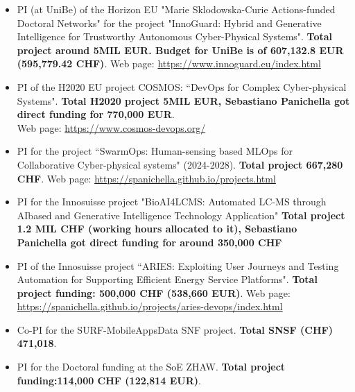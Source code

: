 \documentclass[11pt]{article}
\begin{document}
\begin{itemize}
  \item PI (at UniBe) of the Horizon EU  "Marie Sklodowska-Curie Actions-funded Doctoral Networks" for the project "InnoGuard: Hybrid and Generative Intelligence for Trustworthy Autonomous Cyber-Physical Systems".
\textbf{Total project around 5MIL EUR. Budget for UniBe is of 607,132.8 EUR (595,779.42 CHF)}. Web page: \href{https://www.innoguard.eu/index.html}{https://www.innoguard.eu/index.html}
\vspace{-2.5mm}
  \item PI of the H2020 EU project COSMOS: ``DevOps for Complex Cyber-physical Systems". \textbf{Total H2020 project 5MIL EUR, Sebastiano Panichella got direct funding for 770,000 EUR}. \\Web page: \href{https://www.cosmos-devops.org/}{https://www.cosmos-devops.org/}
\vspace{-2.5mm}
\item PI for   the project ``SwarmOps: Human-sensing based MLOps for Collaborative Cyber-physical systems" (2024-2028).  \textbf{Total project 667,280 CHF}.  Web page: \href{https://spanichella.github.io/projects.html}{https://spanichella.github.io/projects.html}
\vspace{-2.5mm}
\item PI for the Innosuisse project  "BioAI4LCMS: Automated LC-MS through AIbased and Generative Intelligence Technology Application" \textbf{Total project 1.2 MIL CHF (working hours allocated to it), Sebastiano Panichella got direct funding for around 350,000 CHF}
\vspace{-2.5mm}
  \item PI of the Innosuisse project ``ARIES: Exploiting User Journeys and Testing Automation for Supporting Efficient Energy Service Platforms". \textbf{Total project funding: \textbf{500,000 CHF} (538,660 EUR)}. Web page: \href{https://spanichella.github.io/projects/aries-devops/index.html}{https://spanichella.github.io/projects/aries-devops/index.html}
\vspace{-2.5mm}
  \item Co-PI for
   the SURF-MobileAppsData SNF project. \textbf{Total SNSF (CHF) 471,018}. 
\vspace{-2.5mm}
   \item PI for the Doctoral funding at the SoE ZHAW. \textbf{Total project funding:\textbf{114,000 CHF} (122,814 EUR)}.

\end{itemize}
\end{document}
